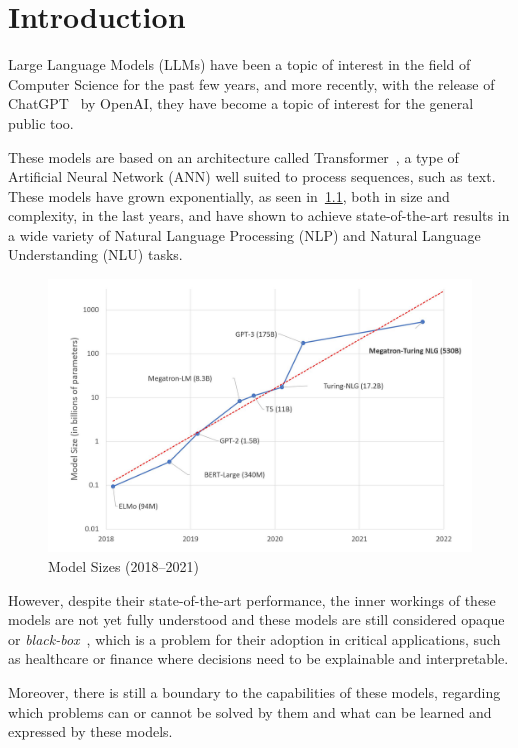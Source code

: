 \chapter{Introduction}

Large Language Models (LLMs) have been a topic of interest in the field of Computer Science for the past few years, and more recently, with the release of ChatGPT~\cite{chatgpt} by OpenAI, they have become a topic of interest for the general public too.

These models are based on an architecture called Transformer~\cite{attention_is_all_you_need}, a type of Artificial Neural Network (ANN)
well suited to process sequences, such as text. These models have grown exponentially, as seen in~\ref{fig:model_sizes}, both in size and complexity, in the last years, and
have shown to achieve state-of-the-art results in a wide variety of Natural Language Processing (NLP) and Natural Language Understanding (NLU) tasks.

\begin{figure}[H]
    \centering
    \includegraphics[width=\textwidth]{figs/model_sizes}
    \caption{Model Sizes (2018--2021)~\cite{model_sizes}}
    \label{fig:model_sizes}
\end{figure}

However, despite their state-of-the-art performance, the inner workings of these models are not yet fully understood and these models are still considered opaque or \emph{black-box}~\cite{lei-etal-2016-rationalizing}, which is a problem for their adoption in critical applications, such as healthcare or finance where decisions need to be explainable and interpretable.

Moreover, there is still a boundary to the capabilities of these models, regarding which problems can or cannot be solved by them and what can be learned and expressed by these models.

